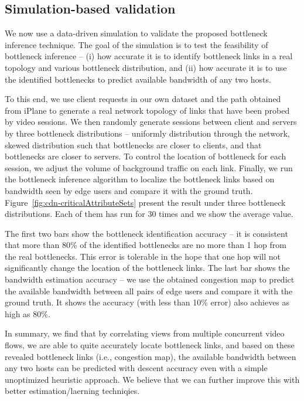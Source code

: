 \subsection{Simulation-based validation}
We now use a data-driven simulation to validate the proposed bottleneck
inference technique. The goal of the simulation is
to test the feasibility of bottleneck inference -- (i) how accurate it is to identify
bottleneck links in a real topology and various bottleneck distribution, and (ii) how accurate it is to use the identified bottlenecks to predict available bandwidth of any two hosts.

To this end, we use client requests in our own dataset and the path obtained
from iPlane to generate a real network topology of links that have been probed
by video sessions. We then randomly generate sessions between client and
servers by three bottleneck distributions -- uniformly
distribution through the network, skewed distribution such that bottlenecks are
closer to clients, and that bottlenecks are closer to
servers. To control the location of bottleneck for each session, we adjust the
volume of background traffic on each link. Finally, we run the bottleneck inference algorithm 
to localize the bottleneck links based on bandwidth seen by edge users and compare it with the ground truth.
Figure~\ref{fig:cdn-criticalAttributeSets} present the result under three bottleneck distributions. Each of them has run for
30 times and we show the average value. 

The first two bars show the bottleneck identification accuracy -- it is consistent that more than 80\% of the identified bottlenecks
are no more than 1 hop from the real bottlenecks. This error is tolerable in the hope
that one hop will not significantly change the location of the bottleneck
links. 
The last bar shows the bandwidth estimation accuracy -- we use the obtained congestion map to predict the available bandwidth between all pairs of edge users and compare it with the ground truth. It shows the accuracy (with less than 10\% error) also achieves as high as 80\%.


In summary, we find that by correlating views from multiple concurrent video flows, we are able to quite accurately locate bottleneck links, and based on these revealed bottleneck links (i.e., congestion map), the available bandwidth between any two hosts can be predicted with descent accuracy even with a simple unoptimized heuristic approach. We believe that we can further improve this with better estimation/laerning techniqies.
